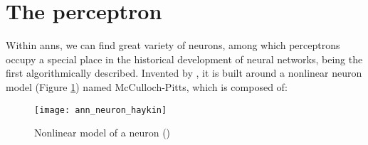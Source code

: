 


                                                                                    


\section{The perceptron}
\label{sec:perceptron}
Within \glspl{ann}, we can find great variety of neurons, among which perceptrons occupy a special place in the historical development of neural networks, being the first algorithmically described. Invented by \cite{rosenblatt1958perceptron}, it is built around a nonlinear neuron model (Figure \ref{fig:nonlinear_neuron_model}) named McCulloch-Pitts, which is composed of:

\begin{figure}[!ht]
	\centering
	\texttt{[image: ann\_neuron\_haykin]}
	\caption{Nonlinear model of a neuron (\cite{haykin2009neural})}
	\label{fig:nonlinear_neuron_model}
\end{figure}


